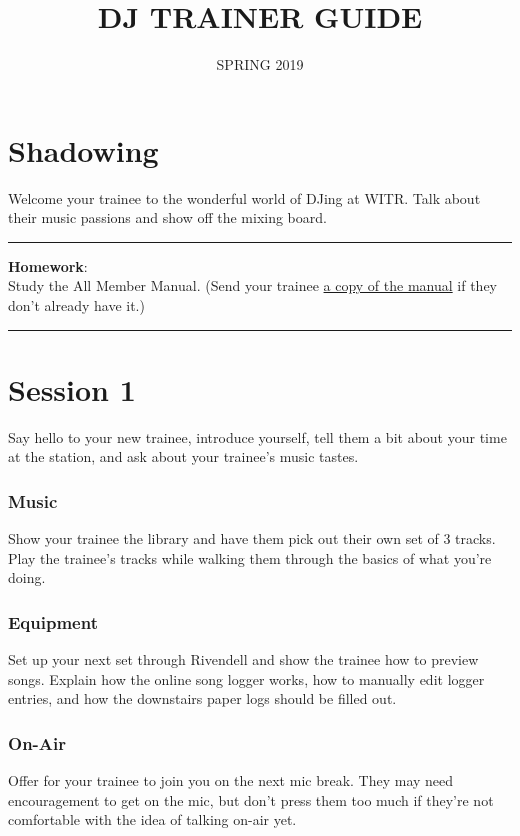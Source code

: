 \documentclass[]{witrman}
\title{DJ TRAINER GUIDE}
\date{SPRING 2019}
\newcommand{\makehomework}[1]{%
\vspace{1mm}
\rule{\textwidth}{1pt}
\textbf{Homework}:\\
#1\\
\rule[2mm]{\textwidth}{1pt}
}
\begin{document}
\maketitle

\maketoc{}

\setpagebg{}

\chapter{Shadowing}

Welcome your trainee to the wonderful world of DJing at WITR\@. Talk about their
music passions and show off the mixing board.

\makehomework{Study the All Member Manual.  (Send your trainee
\href{https://github.com/WITR-Radio/manuals/releases}{a copy of the
manual} if they don't already have it.)}


\chapter{Session 1}

Say hello to your new trainee, introduce yourself, tell them a bit about your
time at the station, and ask about your trainee's music tastes.

\subsection{Music}

Show your trainee the library and have them pick out their own set of 3 tracks.
Play the trainee's tracks while walking them through the basics of what you're
doing.

\subsection{Equipment}

Set up your next set through Rivendell and show the trainee how to preview
songs.  Explain how the online song logger works, how to manually edit logger
entries, and how the downstairs paper logs should be filled out.

\subsection{On-Air}

Offer for your trainee to join you on the next mic break.  They may need
encouragement to get on the mic, but don't press them too much if they're not
comfortable with the idea of talking on-air yet.
\end{document}
